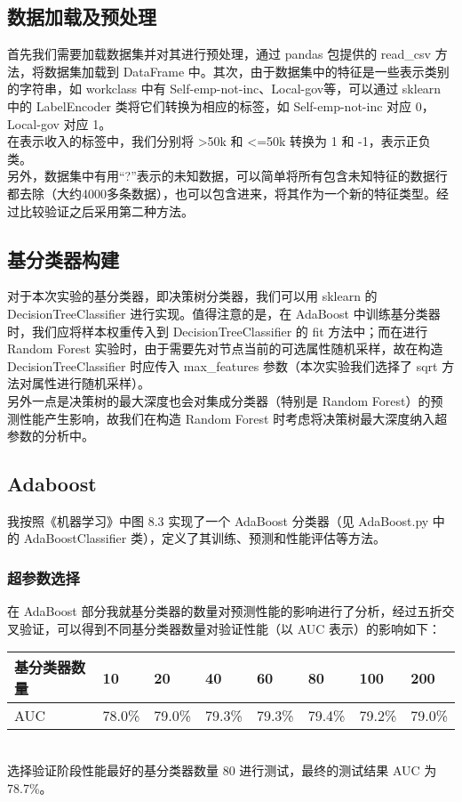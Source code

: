 \documentclass{article}
\begin{document}
\subsection{数据加载及预处理}
首先我们需要加载数据集并对其进行预处理，通过 pandas 包提供的 read\_csv 方法，将数据集加载到 DataFrame 中。其次，由于数据集中的特征是一些表示类别的字符串，如 workclass 中有 Self-emp-not-inc、Local-gov等，可以通过 sklearn 中的 LabelEncoder 类将它们转换为相应的标签，如 Self-emp-not-inc 对应 0，Local-gov 对应 1。\\
在表示收入的标签中，我们分别将 >50k 和 <=50k 转换为 1 和 -1，表示正负类。\\
另外，数据集中有用“?”表示的未知数据，可以简单将所有包含未知特征的数据行都去除（大约4000多条数据），也可以包含进来，将其作为一个新的特征类型。经过比较验证之后采用第二种方法。\\

\subsection{基分类器构建}
对于本次实验的基分类器，即决策树分类器，我们可以用 sklearn 的 DecisionTreeClassifier 进行实现。值得注意的是，在 AdaBoost 中训练基分类器时，我们应将样本权重传入到 DecisionTreeClassifier 的 fit 方法中；而在进行 Random Forest 实验时，由于需要先对节点当前的可选属性随机采样，故在构造 DecisionTreeClassifier 时应传入 max\_features 参数（本次实验我们选择了 sqrt 方法对属性进行随机采样）。\\
另外一点是决策树的最大深度也会对集成分类器（特别是 Random Forest）的预测性能产生影响，故我们在构造 Random Forest 时考虑将决策树最大深度纳入超参数的分析中。\\

\subsection{Adaboost}
我按照《机器学习》中图 8.3 实现了一个 AdaBoost 分类器（见 AdaBoost.py 中的 AdaBoostClassifier 类），定义了其训练、预测和性能评估等方法。

\subsubsection*{超参数选择}
在 AdaBoost 部分我就基分类器的数量对预测性能的影响进行了分析，经过五折交叉验证，可以得到不同基分类器数量对验证性能（以 AUC 表示）的影响如下：\\
\begin{table}[!htbp]
	\begin{tabular}{|l|l|l|l|l|l|l|l|}
		\hline
		基分类器数量 & 10     & 20     & 40     & 60     & 80     & 100    & 200    \\ \hline
		AUC    & 78.0\% & 79.0\% & 79.3\% & 79.3\% & 79.4\% & 79.2\% & 79.0\% \\ \hline
	\end{tabular}
\end{table}\\
选择验证阶段性能最好的基分类器数量 80 进行测试，最终的测试结果 AUC 为 78.7\%。\\
\end{document}
